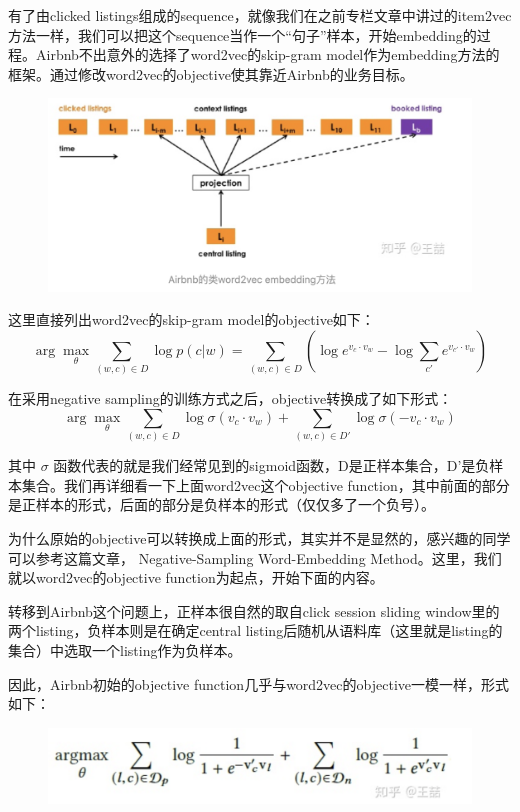\documentclass[12pt]{article}
\begin{document}
有了由clicked listings组成的sequence，就像我们在之前专栏文章中讲过的item2vec方法一样，我们可以把这个sequence当作一个“句子”样本，开始embedding的过程。Airbnb不出意外的选择了word2vec的skip-gram model作为embedding方法的框架。通过修改word2vec的objective使其靠近Airbnb的业务目标。
\begin{figure}[H]
    \centering
    \includegraphics[width=1\textwidth]{fig/Airbnb_Word2Vec_Embedding_For_Session.png}
\end{figure}

这里直接列出word2vec的skip-gram model的objective如下：
$$
\arg\max_\theta \sum_{(w,c) \in D} \log{p(c|w)} = \sum_{(w,c) \in D}(\log{e^{v_c \cdot v_w}} - \log{\sum_{c'}e^{v_{c'} \cdot v_w}})
$$


在采用negative sampling的训练方式之后，objective转换成了如下形式：
$$
\arg\max_\theta \sum_{(w,c) \in D} \log{\sigma(v_c \cdot v_w)} +  \sum_{(w,c) \in D'}\log{\sigma(-v_c \cdot v_w)}
$$

其中 $\sigma$ 函数代表的就是我们经常见到的sigmoid函数，D是正样本集合，D'是负样本集合。我们再详细看一下上面word2vec这个objective function，其中前面的部分是正样本的形式，后面的部分是负样本的形式（仅仅多了一个负号）。

为什么原始的objective可以转换成上面的形式，其实并不是显然的，感兴趣的同学可以参考这篇文章， Negative-Sampling Word-Embedding Method。这里，我们就以word2vec的objective function为起点，开始下面的内容。

转移到Airbnb这个问题上，正样本很自然的取自click session sliding window里的两个listing，负样本则是在确定central listing后随机从语料库（这里就是listing的集合）中选取一个listing作为负样本。

因此，Airbnb初始的objective function几乎与word2vec的objective一模一样，形式如下：
\begin{figure}[H]
    \centering
    \includegraphics[width=1\textwidth]{fig/Airbnb_Click_Objetive.png}
\end{figure}
\end{document}
